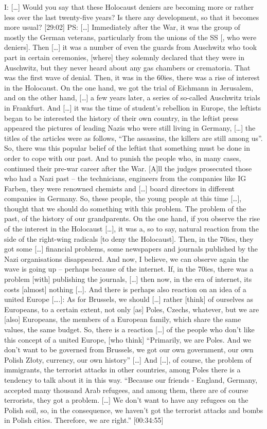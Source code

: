 I: […] Would you say that these Holocaust deniers are becoming more or rather less over the last twenty-five years? Is there any development, so that it becomes more usual? [29:02]
PS: […] Immediately after the War, it was the group of mostly the German veterans, particularly from the unions of the SS [, who were deniers]. Then […] it was a number of even the guards from Auschwitz who took part in certain ceremonies, [where] they solemnly declared that they were in Auschwitz, but they never heard about any gas chambers or crematoria. That was the first wave of denial. Then, it was in the 60ies, there was a rise of interest in the Holocaust. On the one hand, we got the trial of Eichmann in Jerusalem, and on the other hand, […] a few years later, a series of so-called Auschwitz trials in Frankfurt. And […] it was the time of student’s rebellion in Europe, the leftists began to be interested the history of their own country, in the leftist press appeared the pictures of leading Nazis who were still living in Germany, […] the titles of the articles were as follows, “The assassins, the killers are still among us”. So, there was this popular belief of the leftist that something must be done in order to cope with our past. And to punish the people who, in many cases, continued their pre-war career after the War. [A]ll the judges prosecuted those who had a Nazi past – the technicians, engineers from the companies like IG Farben, they were renowned chemists and […] board directors in different companies in Germany. So, these people, the young people at this time […], thought that we should do something with this problem. The problem of the past, of the history of our grandparents. On the one hand, if you observe the rise of the interest in the Holocaust […], it was a, so to say, natural reaction from the side of the right-wing radicals [to deny the Holocaust]. Then, in the 70ies, they got some […] financial problems, some newspapers and journals published by the Nazi organisations disappeared. And now, I believe, we can observe again the wave is going up – perhaps because of the internet. If, in the 70ies, there was a problem [with] publishing the journals, […] then now, in the era of internet, its costs [almost] nothing […]. 
And there is perhaps also reaction on an idea of a united Europe [….]: As for Brussels, we should […] rather [think] of ourselves as Europeans, to a certain extent, not only [as] Poles, Czechs, whatever, but we are [also] Europeans, the members of a European family, which share the same values, the same budget. So, there is a reaction […] of the people who don’t like this concept of a united Europe, [who think] “Primarily, we are Poles. And we don’t want to be governed from Brussels, we got our own government, our own Polish Złoty, currency, our own history” […] And […], of course, the problem of immigrants, the terrorist attacks in other countries, among Poles there is a tendency to talk about it in this way. “Because our friends - England, Germany, accepted many thousand Arab refugees, and among them, there are of course terrorists, they got a problem. […] We don’t want to have any refugees on the Polish soil, so, in the consequence, we haven’t got the terrorist attacks and bombs in Polish cities. Therefore, we are right.” [00:34:55]
